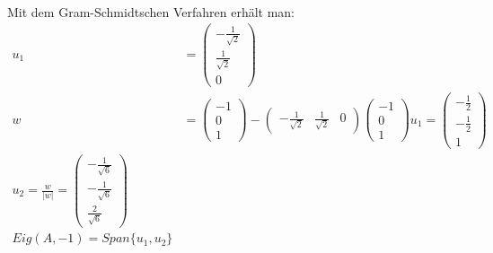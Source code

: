 \begin{itemize}
\begin{align}
\end{align}
Mit dem Gram-Schmidtschen Verfahren erhält man:
\begin{align}
u_1 &= \begin{pmatrix} -\frac{1}{\sqrt{2}} \\ \frac{1}{\sqrt{2}} \\ 0 \end{pmatrix} \\
w &= \begin{pmatrix} -1 \\ 0 \\ 1 \end{pmatrix} - \begin{pmatrix} - \frac{1}{\sqrt{2}} & \frac{1}{\sqrt{2}} & 0 \end{pmatrix} \begin{pmatrix} -1 \\ 0 \\ 1 \end{pmatrix} u_1 = \begin{pmatrix} -\frac{1}{2} \\ -\frac{1}{2} \\ 1 \end{pmatrix} \\
u_2 = \frac{w}{|w|} = \begin{pmatrix} -\frac{1}{\sqrt{6}} \\ -\frac{1}{\sqrt{6}} \\ \frac{2}{\sqrt{6}} \end{pmatrix} \\
Eig(A, -1) = Span\{u_1, u_2\}
\end{align}


\end{itemize}
